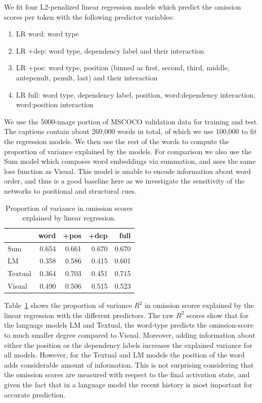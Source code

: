 We fit four L2-penalized linear regression models which predict the omission 
scores per token with the following predictor variables: 
\begin{enumerate}
	\item {\sc LR word}: word type
	\item {\sc LR +dep}: word type, dependency label and their interaction 
	\item {\sc LR +pos}: word type, position (binned as {\sc first, second, third, middle,
	antepenult, penult, last}) and their interaction
	\item {\sc LR full}: word type, dependency label, position, word:dependency interaction, 
	word:position interaction
\end{enumerate}

\noindent We use the 5000-image portion of MSCOCO validation data for 
training and test. The captions contain about 260,000 words in total, of 
which we use 100,000 to fit the regression models. We then use the rest 
of the words to compute the proportion of variance explained by the models. 
For comparison we also use the {\sc Sum} model which composes word
embeddings via summation, and uses the same loss function as {\sc
  Visual}. This model is unable to encode information about word
order, and thus is a good baseline here as we investigate the
sensitivity of the networks to positional and structural cues.

\begin{table}
  \centering
  \caption{Proportion of variance in omission scores explained by
    linear regression.}
    \begin{tabular}{l|rrrr}
               & word   & +pos  & +dep  & full \\\hline
     {\sc Sum}       & 0.654  & 0.661 & 0.670 & 0.670 \\
     {\sc LM}        & 0.358  & 0.586 & 0.415 & 0.601 \\
     {\sc Textual}   & 0.364  & 0.703 & 0.451 & 0.715 \\
     {\sc Visual}    & 0.490  & 0.506 & 0.515 & 0.523 \\
    \end{tabular}
    \label{tab:lr-r2}
\end{table}


Table~\ref{tab:lr-r2} shows the proportion of variance $R^2$ in omission
scores explained by the linear regression with the different predictors.
The raw $R^2$ scores show that for the language models {\sc LM} and 
{\sc Textual}, the word-type predicts the omission-score to much smaller 
degree compared to {\sc Visual}. Moreover, adding information about 
either the position or the dependency labels increases the explained variance for all models. 
However, for the {\sc Textual} and {\sc LM} models the position of the word adds 
considerable amount of information. This is not surprising considering that the omission
scores are measured with respect to the final activation state, and
given the fact that in a language model the recent history is most
important for accurate prediction.

